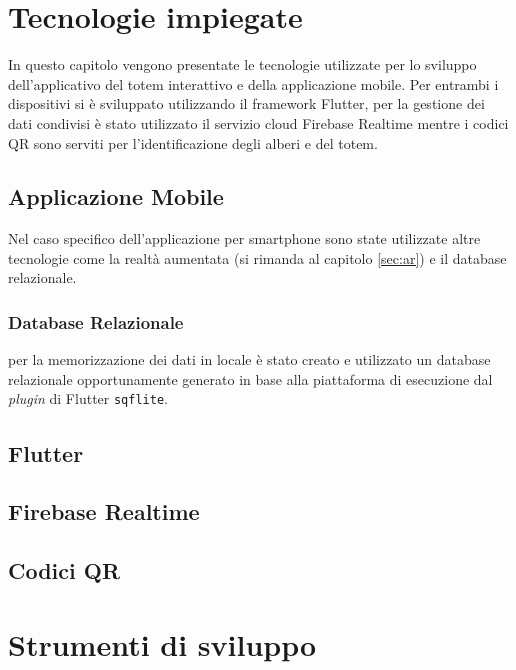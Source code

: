 %
%
%
\section{Tecnologie impiegate}
In questo capitolo vengono presentate le tecnologie utilizzate per lo sviluppo dell'applicativo del totem interattivo e della applicazione mobile. Per entrambi i dispositivi si è sviluppato utilizzando il framework Flutter, per la gestione dei dati condivisi è stato utilizzato il servizio cloud Firebase Realtime mentre i codici QR sono serviti per l'identificazione degli alberi e del totem.

\subsection{Applicazione Mobile}
Nel caso specifico dell'applicazione per smartphone sono state utilizzate altre tecnologie come la realtà aumentata (si rimanda al capitolo \ref{sec:ar}) e il database relazionale.
\subsubsection{Database Relazionale}
per la memorizzazione dei dati in locale è stato creato e utilizzato un database relazionale opportunamente generato in base alla piattaforma di esecuzione dal \textit{plugin} di Flutter \texttt{sqflite}.
\subsection{Flutter}

%
\subsection{Firebase Realtime}

%
\subsection{Codici QR}

%
\section{Strumenti di sviluppo}
